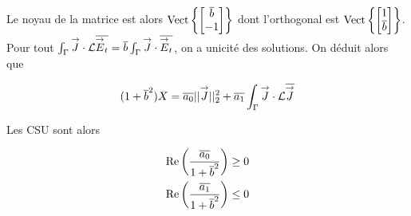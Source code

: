       Le noyau de la matrice est alors \(\Vect{\begin{bmatrix}\conj{b}\\-1\end{bmatrix}}\) dont l'orthogonal est  \(\Vect{\begin{bmatrix}1\\\conj{b}\end{bmatrix}}\).
      Pour tout \(\int_\Gamma \vJ\cdot \LL\conj{\vE_t} = \conj{b} \int_\Gamma \vJ \cdot \conj{\vE_t} \), on a unicité des solutions. On déduit alors que

      \[
        (1 + \conj{b}^2) X = \conj{a_0} ||\vJ||_2^2 + \conj{a_1}\int_\Gamma \vJ \cdot \LL\conj{\vJ}
      \]

      Les CSU sont alors

      \begin{align}
        \Re\left(\frac{\conj{a_0}}{1 + \conj{b}^2}\right) &\ge 0 \\
        \Re\left(\frac{\conj{a_1}}{1 + \conj{b}^2}\right) &\le 0
      \end{align}



